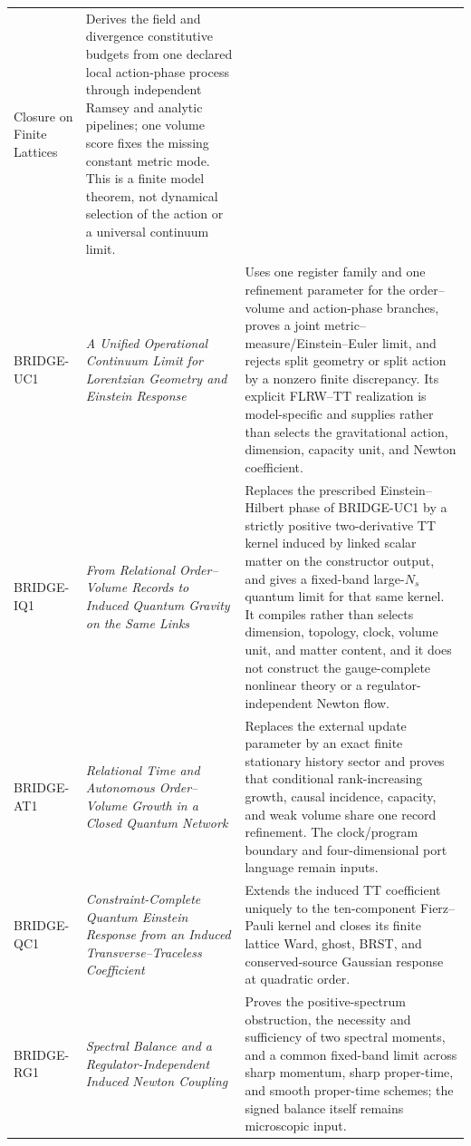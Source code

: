 \begin{longtable}{@{}P{0.10\textwidth}P{0.37\textwidth}P{0.45\textwidth}@{}}
{Closure on Finite Lattices}
& Derives the field and divergence constitutive budgets from one declared
local action-phase process through independent Ramsey and analytic pipelines;
one volume score fixes the missing constant metric mode.  This is a finite
model theorem, not dynamical selection of the action or a universal
continuum limit.\\
BRIDGE-UC1 & \emph{A Unified Operational Continuum Limit for Lorentzian
Geometry and Einstein Response}
& Uses one register family and one refinement parameter for the
order--volume and action-phase branches, proves a joint
metric--measure/Einstein--Euler limit, and rejects split geometry or split
action by a nonzero finite discrepancy.  Its explicit FLRW--TT realization
is model-specific and supplies rather than selects the gravitational action,
dimension, capacity unit, and Newton coefficient.\\
BRIDGE-IQ1 & \emph{From Relational Order--Volume Records to Induced Quantum
Gravity on the Same Links}
& Replaces the prescribed Einstein--Hilbert phase of BRIDGE-UC1 by a
strictly positive two-derivative TT kernel induced by linked scalar matter
on the constructor output, and gives a fixed-band large-\(N_s\) quantum
limit for that same kernel.  It compiles rather than selects dimension,
topology, clock, volume unit, and matter content, and it does not construct
the gauge-complete nonlinear theory or a regulator-independent Newton flow.\\
BRIDGE-AT1 & \emph{Relational Time and Autonomous Order--Volume Growth in a
Closed Quantum Network}
& Replaces the external update parameter by an exact finite stationary
history sector and proves that conditional rank-increasing growth, causal
incidence, capacity, and weak volume share one record refinement.  The
clock/program boundary and four-dimensional port language remain inputs.\\
BRIDGE-QC1 & \emph{Constraint-Complete Quantum Einstein Response from an
Induced Transverse--Traceless Coefficient}
& Extends the induced TT coefficient uniquely to the ten-component
Fierz--Pauli kernel and closes its finite lattice Ward, ghost, BRST, and
conserved-source Gaussian response at quadratic order.\\
BRIDGE-RG1 & \emph{Spectral Balance and a Regulator-Independent Induced
Newton Coupling}
& Proves the positive-spectrum obstruction, the necessity and sufficiency
of two spectral moments, and a common fixed-band limit across sharp
momentum, sharp proper-time, and smooth proper-time schemes; the signed
balance itself remains microscopic input.\\

\end{longtable}
